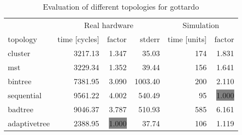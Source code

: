 \begin{table}[htb]
  \centering
  \begin{tabular}{lrrrrr}
  \toprule
  & \multicolumn{3}{c}{Real hardware} & \multicolumn{2}{c}{Simulation} \\
  topology & time [cycles] & factor & stderr & time [units] & factor \\
  \midrule
  cluster & 3217.13 & 1.347 & 35.03 & 174 & 1.831 \\
  mst & 3229.34 & 1.352 & 39.44 & 156 & 1.641 \\
  bintree & 7381.95 & 3.090 & 1003.40 & 200 & 2.110 \\
  sequential & 9561.22 & 4.002 & 540.49 & 95 & \colorbox{gray}{1.000} \\
  badtree & 9046.37 & 3.787 & 510.93 & 585 & 6.161 \\
  adaptivetree & 2388.95 & \colorbox{gray}{1.000} & 37.74 & 106 & 1.119 \\
  \midrule
  \end{tabular}
  \caption{Evaluation of different topologies for gottardo}
  \label{tab:gottardo}
\end{table}
